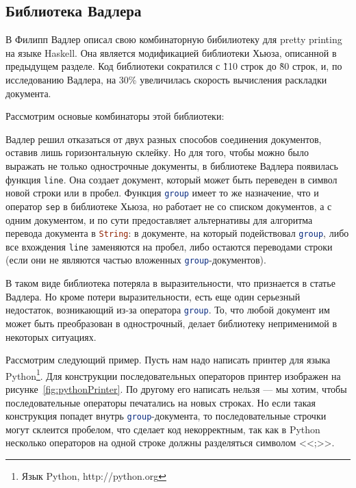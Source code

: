 \newpage

\subsection{Библиотека Вадлера}

В \cite{wadler} Филипп Вадлер описал свою комбинаторную бибилиотеку для pretty printing на языке Haskell. Она является модификацией библиотеки Хьюза, описанной в предыдущем разделе. Код библиотеки сократился с \~110 строк до \~80 строк, и, по исследованию Вадлера, на 30\% увеличилась скорость вычисления раскладки документа.

Рассмотрим основые комбинаторы этой библиотеки:


Вадлер решил отказаться от двух разных способов соединения документов, оставив лишь горизонтальную склейку. Но для того, чтобы можно было выражать не только однострочные документы, в библиотеке Вадлера появилась функция \lstinline[language=Haskell]{line}. Она создает документ, который может быть переведен в символ новой строки или в пробел.
Функция \lstinline[language=Haskell]{group} имеет то же назначение, что и оператор \lstinline[language=Haskell]{sep} в библиотеке Хьюза, но работает не со списком документов, а с одним документом, и по сути предоставляет альтернативы для алгоритма перевода документа в \lstinline[language=Haskell]{String}: в документе, на который подействовал \lstinline[language=Haskell]{group}, либо все вхождения \lstinline[language=Haskell]{line} заменяются на пробел, либо остаются переводами строки (если они не являются частью вложенных \lstinline[language=Haskell]{group}-документов).

В таком виде библиотека потеряла в выразительности, что признается в статье Вадлера. Но кроме потери выразительности, есть еще один серьезный недостаток, возникающий из-за оператора \lstinline[language=Haskell]{group}. То, что любой документ им может быть преобразован в однострочный, делает библиотеку неприменимой в некоторых ситуациях. 

Рассмотрим следующий пример. Пусть нам надо написать принтер для языка Python\footnote{Язык Python, http://python.org}. Для конструкции последовательных операторов принтер изображен на рисунке~\ref{fig:pythonPrinter}.
По другому его написать нельзя --- мы хотим, чтобы последовательные операторы печатались на новых строках. Но если такая конструкция попадет внутрь \lstinline[language=Haskell]{group}-документа, то последовательные строчки могут склеится пробелом, что сделает код некорректным, так как в Python несколько операторов на одной строке должны разделяться символом <<;>>.

